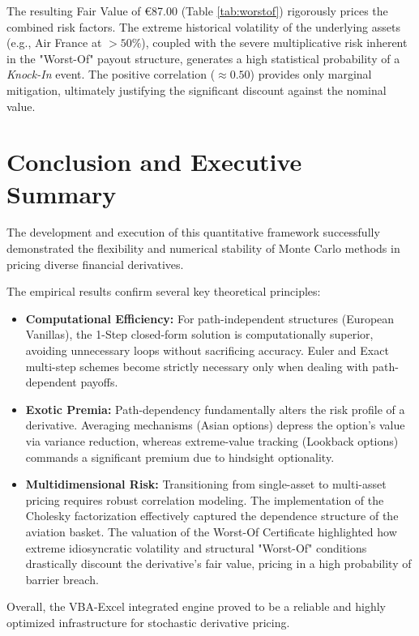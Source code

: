 \documentclass{report}
\begin{document}
The resulting Fair Value of \euro{87.00} (Table \ref{tab:worstof}) rigorously prices the combined risk factors. The extreme historical volatility of the underlying assets (e.g., Air France at $>50\%$), coupled with the severe multiplicative risk inherent in the "Worst-Of" payout structure, generates a high statistical probability of a \textit{Knock-In} event. The positive correlation ($\approx 0.50$) provides only marginal mitigation, ultimately justifying the significant discount against the nominal value.

\section{Conclusion and Executive Summary}
The development and execution of this quantitative framework successfully demonstrated the flexibility and numerical stability of Monte Carlo methods in pricing diverse financial derivatives. 

The empirical results confirm several key theoretical principles:
\begin{itemize}
    \item \textbf{Computational Efficiency:} For path-independent structures (European Vanillas), the 1-Step closed-form solution is computationally superior, avoiding unnecessary loops without sacrificing accuracy. Euler and Exact multi-step schemes become strictly necessary only when dealing with path-dependent payoffs.
    \item \textbf{Exotic Premia:} Path-dependency fundamentally alters the risk profile of a derivative. Averaging mechanisms (Asian options) depress the option's value via variance reduction, whereas extreme-value tracking (Lookback options) commands a significant premium due to hindsight optionality.
    \item \textbf{Multidimensional Risk:} Transitioning from single-asset to multi-asset pricing requires robust correlation modeling. The implementation of the Cholesky factorization effectively captured the dependence structure of the aviation basket. The valuation of the Worst-Of Certificate highlighted how extreme idiosyncratic volatility and structural "Worst-Of" conditions drastically discount the derivative's fair value, pricing in a high probability of barrier breach.
\end{itemize}
Overall, the VBA-Excel integrated engine proved to be a reliable and highly optimized infrastructure for stochastic derivative pricing.
\end{document}

